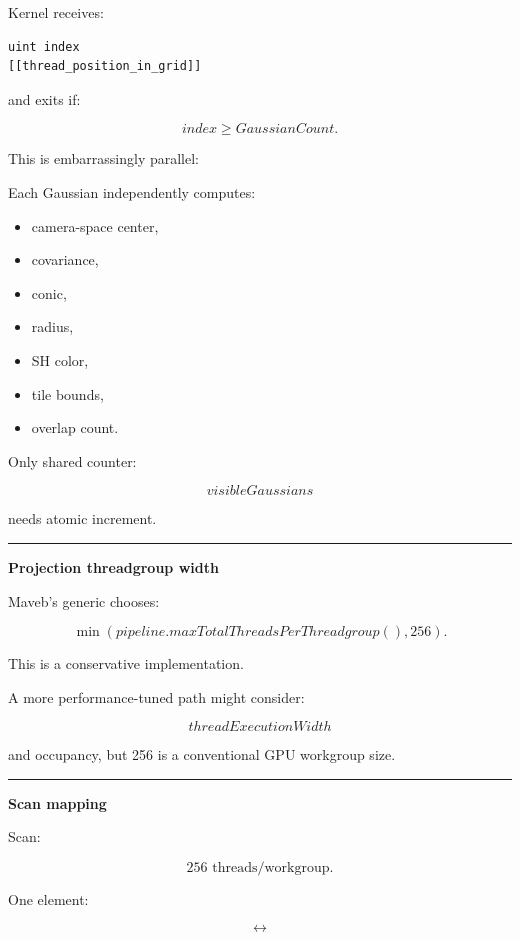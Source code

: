 Kernel receives:

\begin{verbatim}
uint index
[[thread_position_in_grid]]
\end{verbatim}

and exits if:

\[
index\ge GaussianCount.
\]

This is embarrassingly parallel:

Each Gaussian independently computes:

\begin{itemize}
\tightlist
\item
  camera-space center,
\item
  covariance,
\item
  conic,
\item
  radius,
\item
  SH color,
\item
  tile bounds,
\item
  overlap count.
\end{itemize}

Only shared counter:

\[
visibleGaussians
\]

needs atomic increment.

\begin{center}\rule{0.5\linewidth}{0.5pt}\end{center}

\textbf{Projection threadgroup width}

Maveb's generic  chooses:

\[
\min(
pipeline.maxTotalThreadsPerThreadgroup(),
256
).
\]

This is a conservative implementation.

A more performance-tuned path might consider:

\[
threadExecutionWidth
\]

and occupancy, but 256 is a conventional GPU workgroup size.

\begin{center}\rule{0.5\linewidth}{0.5pt}\end{center}

\textbf{Scan mapping}

Scan:

\[
256\text{ threads/workgroup}.
\]

One element:

\[
\leftrightarrow
\]

